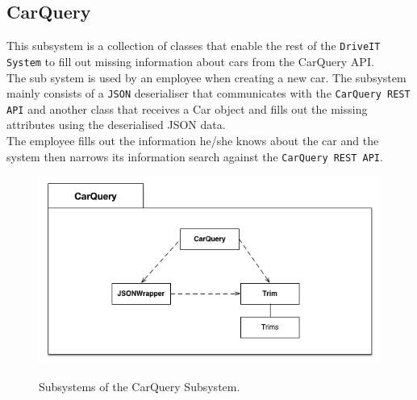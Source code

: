 \subsection{CarQuery} 
This subsystem is a collection of classes that enable the rest of the \texttt{DriveIT System} to fill out missing information about cars from the CarQuery API.\\
The sub system is used by an employee when creating a new car. The subsystem mainly consists of a \texttt{JSON} deserialiser that communicates with the \texttt{CarQuery REST API} and another class that receives a Car object and fills out the missing attributes using the deserialised JSON data. \\
The employee fills out the information he/she knows about the car and the system then narrows its information search against the \texttt{CarQuery REST API}.
\begin{figure}[H]
	\centering
	\includegraphics[width=\textwidth]{Figures/CarQuerySubsystemDecomposition}\\
	\caption{Subsystems of the CarQuery Subsystem.}
\end{figure}